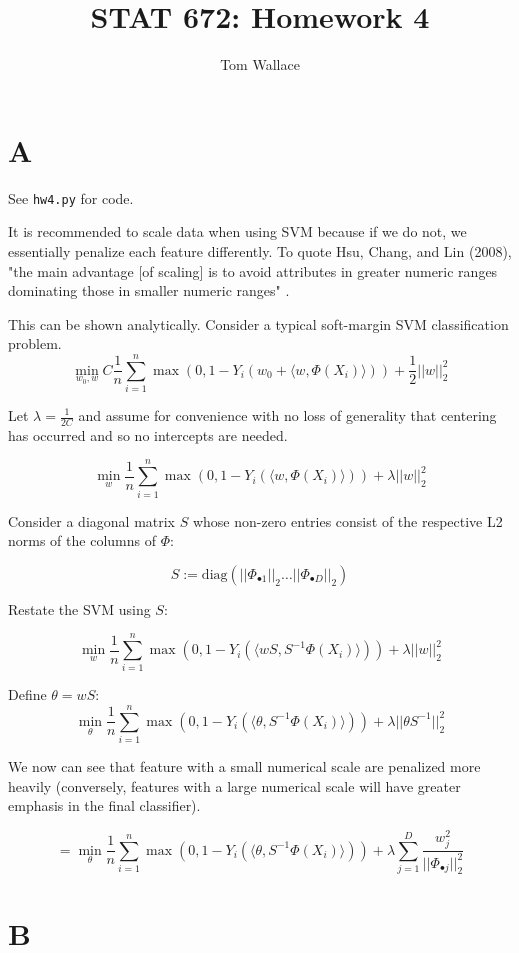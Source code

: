 \documentclass{article}
\title{STAT 672: Homework 4}
\author{Tom Wallace}
\begin{document}
\maketitle

\section*{A}

See \texttt{hw4.py} for code.

It is recommended to scale data when using SVM because if we do not, we
essentially penalize each feature differently. To quote Hsu, Chang, and Lin
(2008), "the main advantage [of scaling] is to avoid attributes in greater
numeric ranges dominating those in smaller numeric ranges" \cite{hsu}.

This can be shown analytically. Consider a typical soft-margin SVM
classification problem.
$$
\min_{w_0, w} C \frac{1}{n} \sum_{i=1}^n \max(0, 1 - Y_i(w_0 +
\langle w, \Phi(X_i) \rangle)) + \frac{1}{2}||w||^2_2
$$

Let $\lambda = \frac{1}{2C}$ and assume for convenience with no loss of
generality that centering has occurred and so no intercepts are needed.

$$
\min_{w} \frac{1}{n} \sum_{i=1}^n \max(0, 1 - Y_i(
\langle w, \Phi(X_i) \rangle)) + \lambda||w||^2_2
$$

Consider a diagonal matrix $S$ whose non-zero entries consist of the
respective L2 norms of the columns of $\Phi$:

$$
S := \mathrm{diag}(||\Phi_{\bullet 1}||_2 \ldots ||\Phi_{\bullet D}||_2)
$$

Restate the SVM using $S$:

$$
\min_{w} \frac{1}{n} \sum_{i=1}^n \max(0, 1 - Y_i(
\langle wS, S^{-1}\Phi(X_i) \rangle)) + \lambda||w||^2_2
$$

Define $\theta = wS$:
$$
\min_{\theta} \frac{1}{n} \sum_{i=1}^n \max(0, 1 - Y_i(
\langle \theta, S^{-1}\Phi(X_i) \rangle)) + \lambda||\theta S^{-1}||^2_2
$$

We now can see that feature with a small numerical scale are penalized more
heavily (conversely, features with a large numerical scale will have greater
emphasis in the final classifier).

$$
= 
\min_{\theta} \frac{1}{n} \sum_{i=1}^n \max(0, 1 - Y_i(
\langle \theta, S^{-1}\Phi(X_i) \rangle)) + \lambda \sum_{j=1}^D
\frac{w_j^2}{||\Phi_{\bullet j}||^2_2}
$$

\section*{B}
\end{document}
